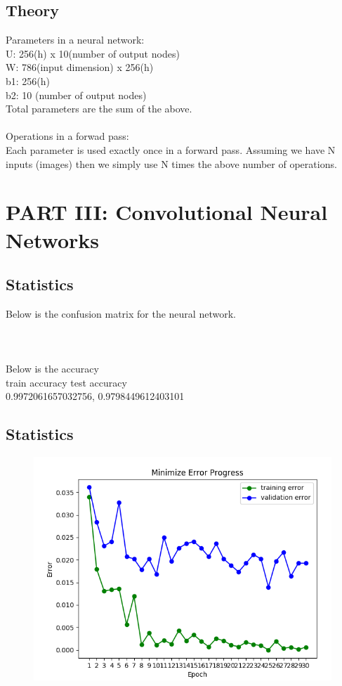 \documentclass[paper=a4, fontsize=11pt]{scrartcl} %
\numberwithin{equation}{section} %
\numberwithin{figure}{section} %
\numberwithin{table}{section} %
\begin{document}
\subsection{Theory}

Parameters in a neural network: \\
U: 256(h) x 10(number of output nodes) \\
W: 786(input dimension) x 256(h) \\
b1: 256(h) \\
b2: 10 (number of output nodes) \\
Total parameters are the sum of the above. \\ \\

Operations in a forwad pass: \\
Each parameter is used exactly once in a forward pass. Assuming we have N inputs (images) then we simply use N times the above number of operations.

\section{PART III: Convolutional Neural Networks}

\subsection{Statistics}
Below is the confusion matrix for the neural network. \\ \\
 \\ \\
Below is the accuracy \\
train accuracy test accuracy\\
0.9972061657032756, 0.9798449612403101

\subsection{Statistics}
\begin{figure}[h]
\center
\includegraphics[trim={0 0cm 0 0cm},clip]{../results/cnn_1024_early_stopping.png}
\end{figure}
\end{document}
